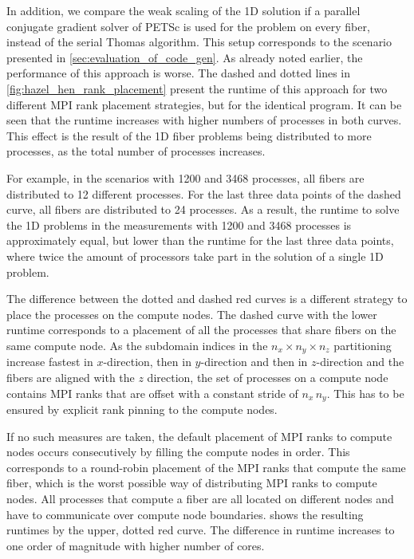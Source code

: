 In addition, we compare the weak scaling of the 1D solution if a parallel conjugate gradient solver of PETSc is used for the problem on every fiber, instead of the serial Thomas algorithm. This setup corresponds to the  scenario presented in \cref{sec:evaluation_of_code_gen}. As already noted earlier, the performance of this approach is worse. The dashed and dotted lines in \cref{fig:hazel_hen_rank_placement} present the runtime of this approach for two different MPI rank placement strategies, but for the identical program. It can be seen that the runtime increases with higher numbers of processes in both curves. This effect is the result of the 1D fiber problems being distributed to more processes, as the total number of processes increases. 

For example, in the scenarios with 1200 and 3468 processes, all fibers are distributed to 12 different processes. For the last three data points of the dashed curve, all fibers are distributed to 24 processes. As a result, the runtime to solve the 1D problems in the measurements with 1200 and 3468 processes is approximately equal, but lower than the runtime for the last three data points, where twice the amount of processors take part in the solution of a single 1D problem.

The difference between the dotted and dashed red curves is a different strategy to place the processes on the compute nodes. The dashed curve with the lower runtime corresponds to a placement of all the processes that share fibers on the same compute node. As the subdomain indices in the $n_x \times n_y \times n_z$ partitioning increase fastest in $x$-direction, then in $y$-direction and then in $z$-direction and the fibers are aligned with the $z$ direction, the set of processes on a compute node contains MPI ranks that are offset with a constant stride of $n_x\,n_y$. This has to be ensured by explicit rank pinning to the compute nodes.

If no such measures are taken, the default placement of MPI ranks to compute nodes occurs consecutively by filling the compute nodes in order. This corresponds to a round-robin placement of the MPI ranks that compute the same fiber, which is the worst possible way of distributing MPI ranks to compute nodes. All processes that compute a fiber are all located on different nodes and have to communicate over compute node boundaries.
 shows the resulting runtimes by the upper, dotted red curve. The difference in runtime increases to one order of magnitude with higher number of cores.

